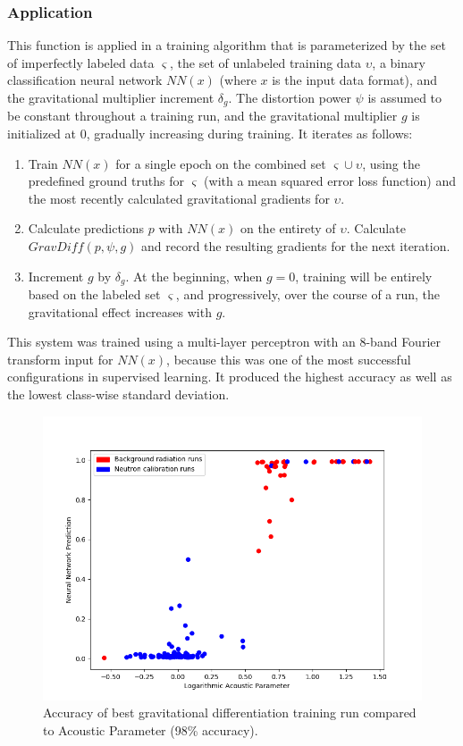 \documentclass[10pt]{article}
\begin{document}
\subsubsection{Application}

This function is applied in a training algorithm that is parameterized by the set of imperfectly labeled data $\varsigma$, the set of unlabeled training data $\upsilon$, a binary classification neural network $NN(x)$ (where $x$ is the input data format), and the gravitational multiplier increment $\delta_g$. The distortion power $\psi$ is assumed to be constant throughout a training run, and the gravitational multiplier $g$ is initialized at 0, gradually increasing during training. It iterates as follows:

\begin{enumerate}
    \item Train $NN(x)$ for a single epoch on the combined set $\varsigma \cup \upsilon$, using the predefined ground truths for $\varsigma$ (with a mean squared error loss function) and the most recently calculated gravitational gradients for $\upsilon$.
    \item Calculate predictions $p$ with $NN(x)$ on the entirety of $\upsilon$. Calculate $GravDiff(p, \psi, g)$ and record the resulting gradients for the next iteration.
    \item Increment $g$ by $\delta_{g}$. At the beginning, when $g = 0$, training will be entirely based on the labeled set $\varsigma$, and progressively, over the course of a run, the gravitational effect increases with $g$.
\end{enumerate}

This system was trained using a multi-layer perceptron with an 8-band Fourier transform input for $NN(x)$, because this was one of the most successful configurations in supervised learning. It produced the highest accuracy as well as the lowest class-wise standard deviation.

\begin{figure}[H]
    \centering
    \includegraphics[width=\textwidth]{grav_opt_validation}
    \caption{\label{grav_opt_validation} Accuracy of best gravitational differentiation training run compared to Acoustic Parameter (98\% accuracy).}
\end{figure}
\end{document}
